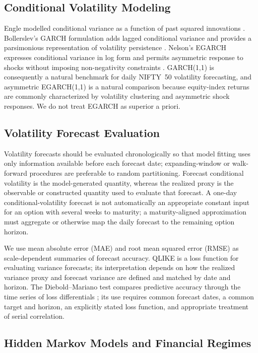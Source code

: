 \documentclass[journal]{IEEEtran}
\begin{document}
\subsection{Conditional Volatility Modeling}

Engle modelled conditional variance as a function of past squared innovations \cite{engle1982}. Bollerslev's GARCH formulation adds lagged conditional variance and provides a parsimonious representation of volatility persistence \cite{bollerslev1986}. Nelson's EGARCH expresses conditional variance in log form and permits asymmetric response to shocks without imposing non-negativity constraints \cite{nelson1991}. GARCH(1,1) is consequently a natural benchmark for daily NIFTY~50 volatility forecasting, and asymmetric EGARCH(1,1) is a natural comparison because equity-index returns are commonly characterized by volatility clustering and asymmetric shock responses. We do not treat EGARCH as superior a priori.

\subsection{Volatility Forecast Evaluation}

Volatility forecasts should be evaluated chronologically so that model fitting uses only information available before each forecast date; expanding-window or walk-forward procedures are preferable to random partitioning. Forecast conditional volatility is the model-generated quantity, whereas the realized proxy is the observable or constructed quantity used to evaluate that forecast. A one-day conditional-volatility forecast is not automatically an appropriate constant input for an option with several weeks to maturity; a maturity-aligned approximation must aggregate or otherwise map the daily forecast to the remaining option horizon.

We use mean absolute error (MAE) and root mean squared error (RMSE) as scale-dependent summaries of forecast accuracy. QLIKE is a loss function for evaluating variance forecasts; its interpretation depends on how the realized variance proxy and forecast variance are defined and matched by date and horizon. The Diebold--Mariano test compares predictive accuracy through the time series of loss differentials \cite{diebold_mariano}; its use requires common forecast dates, a common target and horizon, an explicitly stated loss function, and appropriate treatment of serial correlation.

\subsection{Hidden Markov Models and Financial Regimes}
\end{document}
